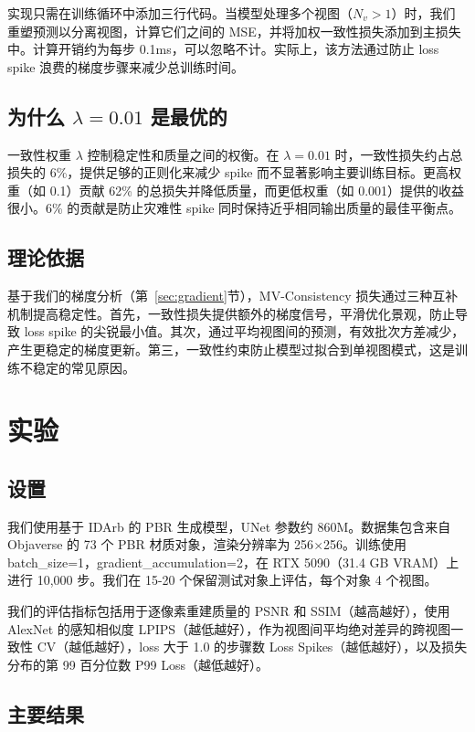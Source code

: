 \documentclass{article}
\begin{document}
实现只需在训练循环中添加三行代码。当模型处理多个视图（$N_v > 1$）时，我们重塑预测以分离视图，计算它们之间的 MSE，并将加权一致性损失添加到主损失中。计算开销约为每步 0.1ms，可以忽略不计。实际上，该方法通过防止 loss spike 浪费的梯度步骤来减少总训练时间。

\subsection{为什么 $\lambda=0.01$ 是最优的}

一致性权重 $\lambda$ 控制稳定性和质量之间的权衡。在 $\lambda=0.01$ 时，一致性损失约占总损失的 6\%，提供足够的正则化来减少 spike 而不显著影响主要训练目标。更高权重（如 0.1）贡献 62\% 的总损失并降低质量，而更低权重（如 0.001）提供的收益很小。6\% 的贡献是防止灾难性 spike 同时保持近乎相同输出质量的最佳平衡点。

\subsection{理论依据}

基于我们的梯度分析（第~\ref{sec:gradient}节），MV-Consistency 损失通过三种互补机制提高稳定性。首先，一致性损失提供额外的梯度信号，平滑优化景观，防止导致 loss spike 的尖锐最小值。其次，通过平均视图间的预测，有效批次方差减少，产生更稳定的梯度更新。第三，一致性约束防止模型过拟合到单视图模式，这是训练不稳定的常见原因。

\section{实验}

\subsection{设置}

我们使用基于 IDArb 的 PBR 生成模型，UNet 参数约 860M。数据集包含来自 Objaverse 的 73 个 PBR 材质对象，渲染分辨率为 256$\times$256。训练使用 batch\_size=1，gradient\_accumulation=2，在 RTX 5090（31.4 GB VRAM）上进行 10,000 步。我们在 15-20 个保留测试对象上评估，每个对象 4 个视图。

我们的评估指标包括用于逐像素重建质量的 PSNR 和 SSIM（越高越好），使用 AlexNet 的感知相似度 LPIPS（越低越好），作为视图间平均绝对差异的跨视图一致性 CV（越低越好），loss 大于 1.0 的步骤数 Loss Spikes（越低越好），以及损失分布的第 99 百分位数 P99 Loss（越低越好）。

\subsection{主要结果}
\end{document}
